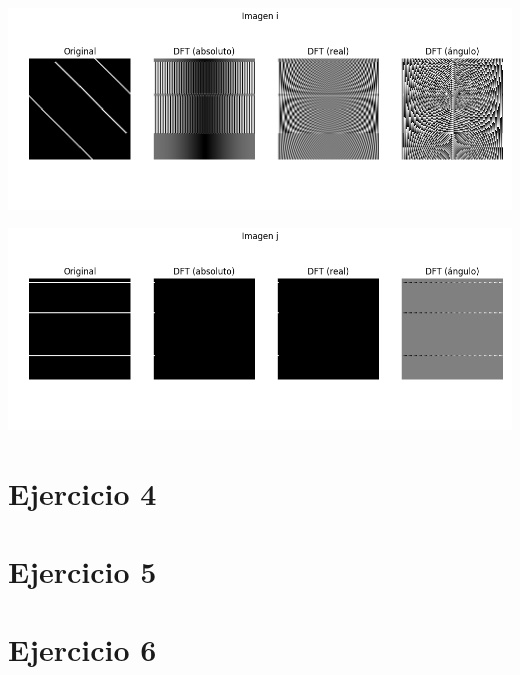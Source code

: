 \documentclass[a4paper]{article}
\begin{document}
\includegraphics[scale=0.5]{imgs/3-i.png}

\includegraphics[scale=0.5]{imgs/3-j.png}

\section{Ejercicio 4}

\section{Ejercicio 5}
\section{Ejercicio 6}
\end{document}
